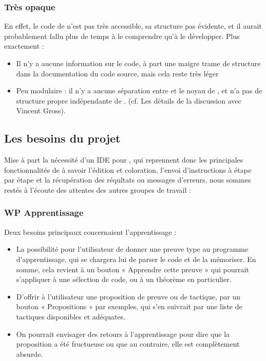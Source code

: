 \subsubsection{Très opaque}

En effet, le code de \CoqIde{} n'est pas très accessible, sa structure pas évidente, et il aurait probablement fallu plus de temps à le comprendre qu'à le développer. Plus exactement :

\begin{itemize}
  \item Il n'y a aucune information sur le code, à part une maigre trame de structure dans la documentation du code source, mais cela reste très léger
  \item Peu modulaire : il n'y a aucune séparation entre \CoqIde{} et le noyau de \Coq{}, et \CoqIde{} n'a pas de structure propre indépendante de \Coq{}. (cf. Les détails de la discussion avec Vincent Gross).
\end{itemize}
    
\subsection{Les besoins du projet \coquille}

Mise à part la nécessité d'un IDE pour \Coq{}, qui reprennent donc les principales fonctionnalités de \CoqIde{} à savoir l'édition et coloration, l'envoi d'instructions à \coqtop{} étape par étape et la récupération des réqultats ou messages d'erreurs, nous sommes restés à l'écoute des attentes des autres groupes de travail :

\subsubsection{WP Apprentissage}

Deux besoins principaux concernaient l'apprentissage :
\begin{itemize}
  \item La possibilité pour l'utilisateur de donner une preuve type au programme d'apprentissage, qui se chargera lui de parser le code et de la mémoriser. En somme, cela revient à un bouton « Apprendre cette preuve » qui pourrait s'appliquer à une sélection de code, ou à un théorème en particulier.
  \item D'offrir à l'utilisateur une proposition de preuve ou de tactique, par un bouton « Propositions » par exemples, qui s'en suivrait par une liste de tactiques disponibles et adéquates.
  \item On pourrait envisager des retours à l'apprentissage pour dire que la proposition a été fructueuse ou que au contraire, elle est complètement absurde.
\end{itemize}
      
